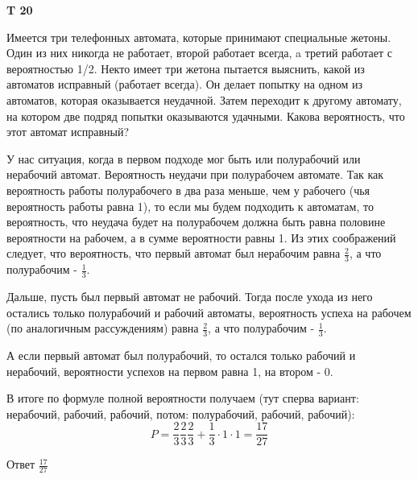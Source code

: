 \documentclass[a4paper,12pt]{article} %
\begin{document}
\begin{example}\textbf{T 20}

Имеется три телефонных автомата, которые принимают специальные жетоны. 
Один из них никогда не работает, второй работает всегда, a третий работает с вероятностью 1/2. 
Некто имеет три жетона  пытается выяснить, какой из автоматов исправный (работает всегда). 
Он делает попытку на одном из автоматов, которая оказывается неудачной.
Затем переходит к другому автомату, на котором две подряд попытки оказываются удачными. 
Какова вероятность, что этот автомат исправный?


У нас ситуация, когда в первом подходе мог быть или полурабочий или нерабочий автомат.
Вероятность неудачи при полурабочем автомате. 
Так как вероятность работы полурабочего в два раза меньше, чем у рабочего (чья вероятность работы равна 1), 
то если мы будем подходить к автоматам, то вероятность, что неудача будет на полурабочем должна быть равна половине вероятности на рабочем, а в сумме вероятности равны 1. 
Из этих соображений следует, что вероятность, что первый автомат был нерабочим равна $ \frac{2}{3}$, а что полурабочим - $ \frac{1}{3}$.

Дальше, пусть был первый автомат не рабочий. Тогда после ухода из него остались только полурабочий и рабочий автоматы, 
вероятность успеха на рабочем (по аналогичным рассуждениям) равна $ \frac{2}{3}$, а что полурабочим - $ \frac{1}{3}$.

А если первый автомат был полурабочий, то остался только рабочий и нерабочий, вероятности успехов на первом равна 1, на втором - 0.

В итоге по формуле полной вероятности получаем (тут сперва вариант: нерабочий, рабочий, рабочий, потом: полурабочий, рабочий, рабочий):
\[ P=\frac{2}{3} \frac{2}{3} \frac{2}{3}+\frac{1}{3}\cdot 1\cdot 1=\frac{17}{27}
\]

Ответ $ \frac{17}{27} $

\end{example}
\end{document}
